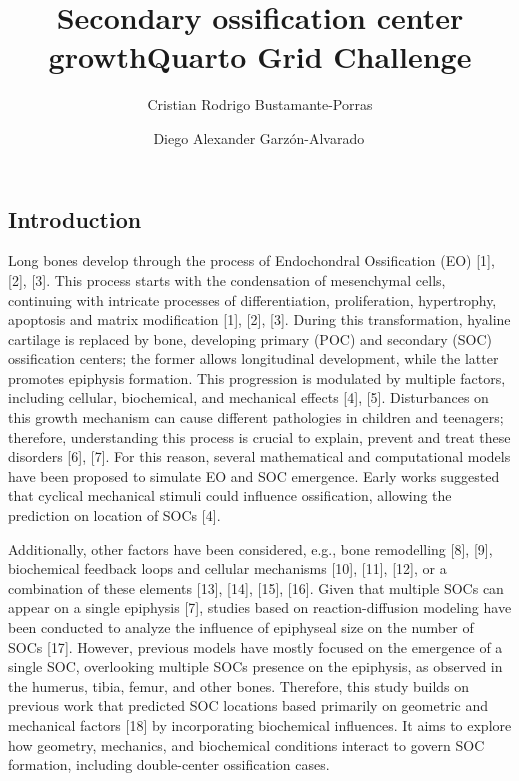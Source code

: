 \documentclass[
  letterpaper,
  DIV=11,
  numbers=noendperiod]{scrartcl}
\title{Secondary ossification center growth}
\author[1]{Cristian Rodrigo Bustamante-Porras}
\author[1]{Diego Alexander Garzón-Alvarado\,\orcidlink{0000-0003-0072-3738}}
\affil[1]{GNUM Research Group, Department of Mechanical and Mechatronics Engineering, Universidad Nacional de Colombia, Carrera 30 45-03, Bogotá D.C., 111321, Colombia}
\title{Quarto Grid Challenge}
\author{}
\date{}
\begin{document}
\maketitle


\linenumbers

\subsection{Introduction}\label{introduction}

Long bones develop through the process of Endochondral Ossification (EO)
{[}1{]}, {[}2{]}, {[}3{]}. This process starts with the condensation of
mesenchymal cells, continuing with intricate processes of
differentiation, proliferation, hypertrophy, apoptosis and matrix
modification {[}1{]}, {[}2{]}, {[}3{]}. During this transformation,
hyaline cartilage is replaced by bone, developing primary (POC) and
secondary (SOC) ossification centers; the former allows longitudinal
development, while the latter promotes epiphysis formation. This
progression is modulated by multiple factors, including cellular,
biochemical, and mechanical effects {[}4{]}, {[}5{]}. Disturbances on
this growth mechanism can cause different pathologies in children and
teenagers; therefore, understanding this process is crucial to explain,
prevent and treat these disorders {[}6{]}, {[}7{]}. For this reason,
several mathematical and computational models have been proposed to
simulate EO and SOC emergence. Early works suggested that cyclical
mechanical stimuli could influence ossification, allowing the prediction
on location of SOCs {[}4{]}.

Additionally, other factors have been considered, e.g., bone remodelling
{[}8{]}, {[}9{]}, biochemical feedback loops and cellular mechanisms
{[}10{]}, {[}11{]}, {[}12{]}, or a combination of these elements
{[}13{]}, {[}14{]}, {[}15{]}, {[}16{]}. Given that multiple SOCs can
appear on a single epiphysis {[}7{]}, studies based on
reaction-diffusion modeling have been conducted to analyze the influence
of epiphyseal size on the number of SOCs {[}17{]}. However, previous
models have mostly focused on the emergence of a single SOC, overlooking
multiple SOCs presence on the epiphysis, as observed in the humerus,
tibia, femur, and other bones. Therefore, this study builds on previous
work that predicted SOC locations based primarily on geometric and
mechanical factors {[}18{]} by incorporating biochemical influences. It
aims to explore how geometry, mechanics, and biochemical conditions
interact to govern SOC formation, including double-center ossification
cases.
\end{document}
